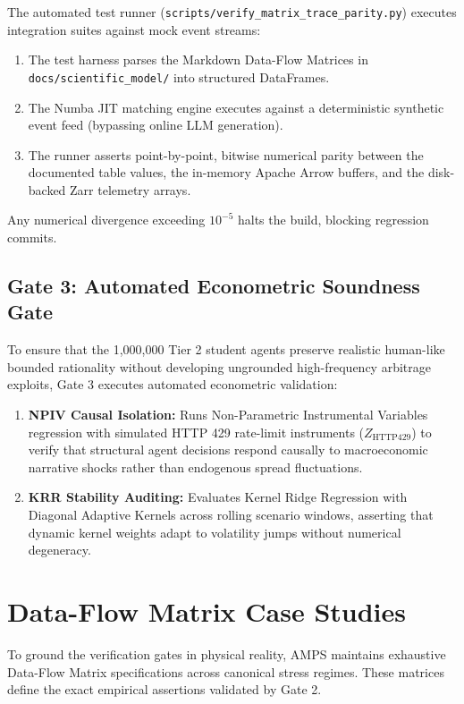 The automated test runner (\texttt{scripts/verify\_matrix\_trace\_parity.py}) executes integration suites against mock event streams:
\begin{enumerate}
    \item The test harness parses the Markdown Data-Flow Matrices in \texttt{docs/scientific\allowbreak\_model/} into structured DataFrames.
    \item The Numba JIT matching engine executes against a deterministic synthetic event feed (bypassing online LLM generation).
    \item The runner asserts point-by-point, bitwise numerical parity between the documented table values, the in-memory Apache Arrow buffers, and the disk-backed Zarr telemetry arrays.
\end{enumerate}

Any numerical divergence exceeding $10^{-5}$ halts the build, blocking regression commits.

\subsection{Gate 3: Automated Econometric Soundness Gate}

To ensure that the 1,000,000 Tier 2 student agents preserve realistic human-like bounded rationality without developing ungrounded high-frequency arbitrage exploits, Gate 3 executes automated econometric validation:

\begin{enumerate}
    \item \textbf{NPIV Causal Isolation:} Runs Non-Parametric Instrumental Variables regression with simulated HTTP 429 rate-limit instruments ($Z_{\text{HTTP429}}$) to verify that structural agent decisions respond causally to macroeconomic narrative shocks rather than endogenous spread fluctuations.
    \item \textbf{KRR Stability Auditing:} Evaluates Kernel Ridge Regression with Diagonal Adaptive Kernels across rolling scenario windows, asserting that dynamic kernel weights adapt to volatility jumps without numerical degeneracy.
\end{enumerate}

\section{Data-Flow Matrix Case Studies}

To ground the verification gates in physical reality, AMPS maintains exhaustive Data-Flow Matrix specifications across canonical stress regimes. These matrices define the exact empirical assertions validated by Gate 2.

